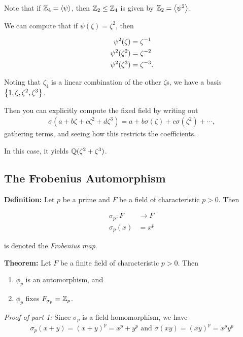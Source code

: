 Note that if \({\mathbb{Z}}_4 = \left\langle{\psi}\right\rangle\), then \({\mathbb{Z}}_2 \leq {\mathbb{Z}}_4\) is
given by \({\mathbb{Z}}_2 = \left\langle{\psi^2}\right\rangle\).

We can compute that if \(\psi(\zeta) = \zeta^2\), then

\begin{align*}
\psi^2(\zeta) &= \zeta^{-1} \\
\psi^2(\zeta^2) &= \zeta^{-2}\\
\psi^2(\zeta^3) &= \zeta^{-3}
.\end{align*}

Noting that \(\zeta_4\) is a linear combination of the other \(\zeta\)s,
we have a basis \(\left\{{1, \zeta, \zeta^2, \zeta^3}\right\}\).

Then you can explicitly compute the fixed field by writing out
\begin{align*}
\sigma(a + b\zeta + c\zeta^2 + d\zeta^3) = a + b\sigma(\zeta) + c\sigma(\zeta^2) + \cdots
,\end{align*} gathering terms, and seeing how this restricts the
coefficients.

In this case, it yields \({\mathbb{Q}}(\zeta^2 + \zeta^3)\).

\hypertarget{the-frobenius-automorphism}{%
\subsection{The Frobenius
Automorphism}\label{the-frobenius-automorphism}}

\textbf{Definition:} Let \(p\) be a prime and \(F\) be a field of
characteristic \(p>0\). Then

\begin{align*}
\sigma_p: F &\to F \\
\sigma_p(x) &= x^p
\end{align*}

is denoted the \emph{Frobenius map}.

\textbf{Theorem:} Let \(F\) be a finite field of characteristic
\(p > 0\). Then

\begin{enumerate}
\def\labelenumi{\arabic{enumi}.}
\tightlist
\item
  \(\phi_p\) is an automorphism, and
\item
  \(\phi_p\) fixes \(F_{\sigma_p} = {\mathbb{Z}}_p\).
\end{enumerate}

\emph{Proof of part 1:} Since \(\sigma_p\) is a field homomorphism, we
have
\begin{align*}
\sigma_p(x+y) = (x+y)^p = x^p + y^p
\text{ and }
\sigma(xy) = (xy)^p = x^p y^p
\end{align*}

